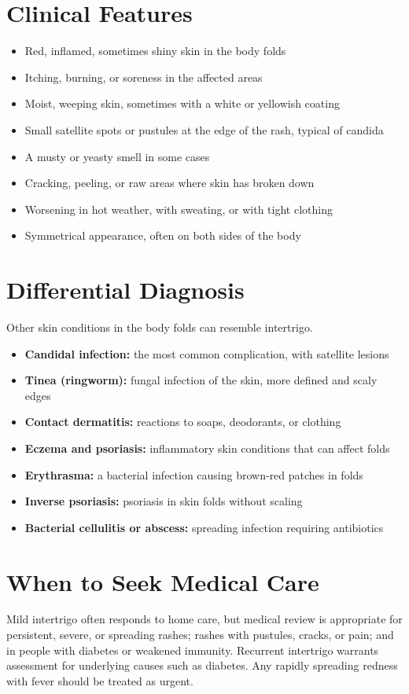 \section*{Clinical Features}
\begin{itemize}
    \item Red, inflamed, sometimes shiny skin in the body folds
    \item Itching, burning, or soreness in the affected areas
    \item Moist, weeping skin, sometimes with a white or yellowish coating
    \item Small satellite spots or pustules at the edge of the rash, typical of candida
    \item A musty or yeasty smell in some cases
    \item Cracking, peeling, or raw areas where skin has broken down
    \item Worsening in hot weather, with sweating, or with tight clothing
    \item Symmetrical appearance, often on both sides of the body
\end{itemize}

\section*{Differential Diagnosis}
Other skin conditions in the body folds can resemble intertrigo.
\begin{itemize}
    \item \textbf{Candidal infection:} the most common complication, with satellite lesions
    \item \textbf{Tinea (ringworm):} fungal infection of the skin, more defined and scaly edges
    \item \textbf{Contact dermatitis:} reactions to soaps, deodorants, or clothing
    \item \textbf{Eczema and psoriasis:} inflammatory skin conditions that can affect folds
    \item \textbf{Erythrasma:} a bacterial infection causing brown-red patches in folds
    \item \textbf{Inverse psoriasis:} psoriasis in skin folds without scaling
    \item \textbf{Bacterial cellulitis or abscess:} spreading infection requiring antibiotics
\end{itemize}

\section*{When to Seek Medical Care}
Mild intertrigo often responds to home care, but medical review is appropriate for persistent, severe, or spreading rashes; rashes with pustules, cracks, or pain; and in people with diabetes or weakened immunity. Recurrent intertrigo warrants assessment for underlying causes such as diabetes. Any rapidly spreading redness with fever should be treated as urgent.

